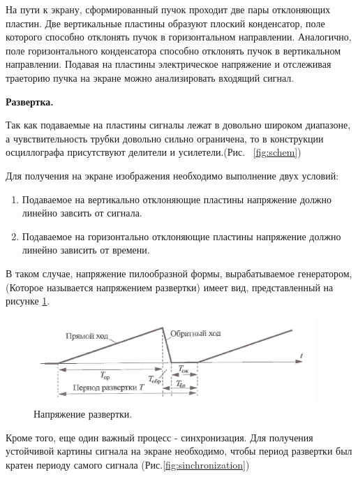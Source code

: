 \documentclass[12pt,a4paper]{article}
\begin{document}
	На пути к экрану, сформированный пучок проходит две пары отклоняющих пластин. Две вертикальные пластины образуют плоский конденсатор, поле которого способно отклонять пучок в горизонтальном направлении. Аналогично, поле горизонтального конденсатора способно отклонять пучок в вертикальном направлении. Подавая на пластины электрическое напряжение и отслеживая траеторию пучка на экране можно анализировать входящий сигнал.
	
	\textbf{Развертка.}
	
	Так как подаваемые на пластины сигналы лежат в довольно широком диапазоне, а чувствительность трубки довольно сильно ограничена, то в конструкции осциллографа присутствуют делители и усилетели.(Рис. ~\ref{fig:schem})
	
	Для получения на экране изображения необходимо выполнение двух условий:
	
	\begin{enumerate}
		\item Подаваемое на вертикально отклоняющие пластины напряжение должно линейно завсить от сигнала.
		\item Подаваемое на горизонтально отклоняющие пластины напряжение должно линейно зависить от времени.
	\end{enumerate}
	
	В таком случае, напряжение пилообразной формы, вырабатываемое генератором, (Которое называется напряжением развертки) имеет вид, представленный на рисунке \ref{fig:voltage}.
	
	
	\begin{figure}[h]
		\begin{center}
			\includegraphics[width = 0.95\textwidth]{voltage_razv}
			\caption{Напряжение развертки.}
			\label{fig:voltage}
		\end{center}
	\end{figure}

	Кроме того, еще один важный процесс - синхронизация. Для получения устойчивой картины сигнала на экране необходимо, чтобы период развертки был кратен периоду самого сигнала (Рис.\ref{fig:sinchronization})
	
\end{document}
